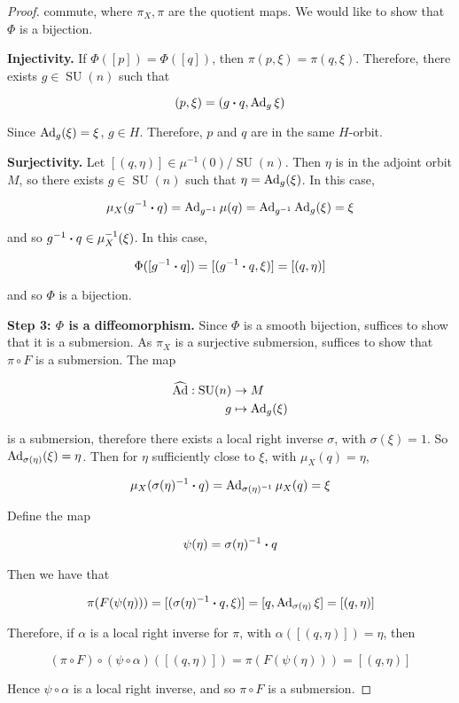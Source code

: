 \documentclass{article}
\DeclareMathOperator{\SU}{SU}
\begin{document}
\begin{proof}
    commute, where \(\pi_X, \pi\) are the quotient maps. We would like to show that \(\Phi\) is a bijection.

    \textbf{Injectivity.} If \(\Phi([p]) = \Phi([q])\), then \(\pi(p, \xi) = \pi(q, \xi)\). Therefore, there exists \(g \in \SU(n)\) such that

    \[(p, \xi) = (g \vdot q, \Ad_g\xi)\]

    Since \(\operatorname{Ad}_g(\xi) = \xi\), \(g \in H\). Therefore, \(p\) and \(q\) are in the same \(H\)-orbit.

    \textbf{Surjectivity.} Let \([(q, \eta)] \in \mu^{-1}(0)/\SU(n)\). Then \(\eta\) is in the adjoint orbit \(M\), so there exists \(g \in \SU(n)\) such that \(\eta = \operatorname{Ad}_g(\xi)\). In this case,

    \[\mu_X(g^{-1} \vdot q) = \Ad_{g^{-1}}\mu(q) = \Ad_{g^{-1}}\Ad_g(\xi) = \xi\]

    and so \(g^{-1} \vdot q \in \mu_X^{-1}(\xi)\). In this case,

    \[\Phi([g^{-1} \vdot q]) = [(g^{-1} \vdot q, \xi)] = [(q, \eta)]\]

    and so \(\Phi\) is a bijection.

    \textbf{Step 3: \(\Phi\) is a diffeomorphism.} Since \(\Phi\) is a smooth bijection, suffices to show that it is a submersion. As \(\pi_X\) is a surjective submersion, suffices to show that \(\pi \circ F\) is a submersion. The map
    
    \begin{align*}
        \widehat{\Ad} : \SU(n) &\to M \\
        g &\mapsto \Ad_g(\xi)
    \end{align*}

    is a submersion, therefore there exists a local right inverse \(\sigma\), with \(\sigma(\xi) = 1\). So \(\operatorname{Ad}_{\sigma(\eta)}(\xi) = \eta\). Then for \(\eta\) sufficiently close to \(\xi\), with \(\mu_X(q) = \eta\),

    \[\mu_X(\sigma(\eta)^{-1} \vdot q) = \Ad_{\sigma(\eta)^{-1}}\mu_X(q) = \xi\]

    Define the map

    \begin{align*}
        \psi(\eta) = \sigma(\eta)^{-1} \vdot q
    \end{align*}

    Then we have that

    \[\pi(F(\psi(\eta))) = [(\sigma(\eta)^{-1} \vdot q, \xi)] = [q, \Ad_{\sigma(\eta)}\xi] = [(q, \eta)]\]

    Therefore, if \(\alpha\) is a local right inverse for \(\pi\), with \(\alpha([(q, \eta)]) = \eta\), then

    \[(\pi \circ F) \circ (\psi \circ \alpha)([(q, \eta)]) = \pi(F(\psi(\eta))) = [(q, \eta)]\]

    Hence \(\psi \circ \alpha\) is a local right inverse, and so \(\pi \circ F\) is a submersion.
\end{proof}
\end{document}
